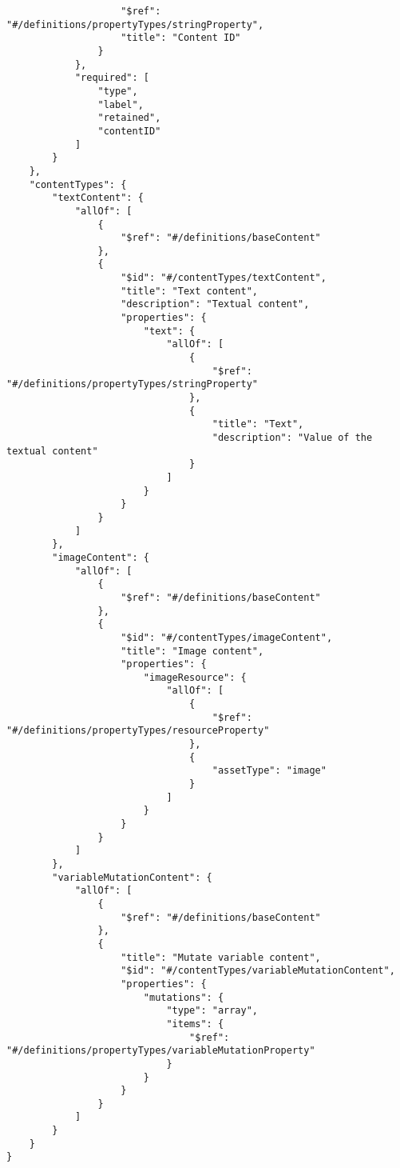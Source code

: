 \begin{appendices}
\begin{lstlisting}
                    "$ref": "#/definitions/propertyTypes/stringProperty",
                    "title": "Content ID"
                }
            },
            "required": [
                "type",
                "label",
                "retained",
                "contentID"
            ]
        }
    },
    "contentTypes": {
        "textContent": {
            "allOf": [
                {
                    "$ref": "#/definitions/baseContent"
                },
                {
                    "$id": "#/contentTypes/textContent",
                    "title": "Text content",
                    "description": "Textual content",
                    "properties": {
                        "text": {
                            "allOf": [
                                {
                                    "$ref": "#/definitions/propertyTypes/stringProperty"
                                },
                                {
                                    "title": "Text",
                                    "description": "Value of the textual content"
                                }
                            ]
                        }
                    }
                }
            ]
        },
        "imageContent": {
            "allOf": [
                {
                    "$ref": "#/definitions/baseContent"
                },
                {
                    "$id": "#/contentTypes/imageContent",
                    "title": "Image content",
                    "properties": {
                        "imageResource": {
                            "allOf": [
                                {
                                    "$ref": "#/definitions/propertyTypes/resourceProperty"
                                },
                                {
                                    "assetType": "image"
                                }
                            ]
                        }
                    }
                }
            ]
        },
        "variableMutationContent": {
            "allOf": [
                {
                    "$ref": "#/definitions/baseContent"
                },
                {
                    "title": "Mutate variable content",
                    "$id": "#/contentTypes/variableMutationContent",
                    "properties": {
                        "mutations": {
                            "type": "array",
                            "items": {
                                "$ref": "#/definitions/propertyTypes/variableMutationProperty"
                            }
                        }
                    }
                }
            ]
        }
    }
}
    \end{lstlisting}


\end{appendices}
